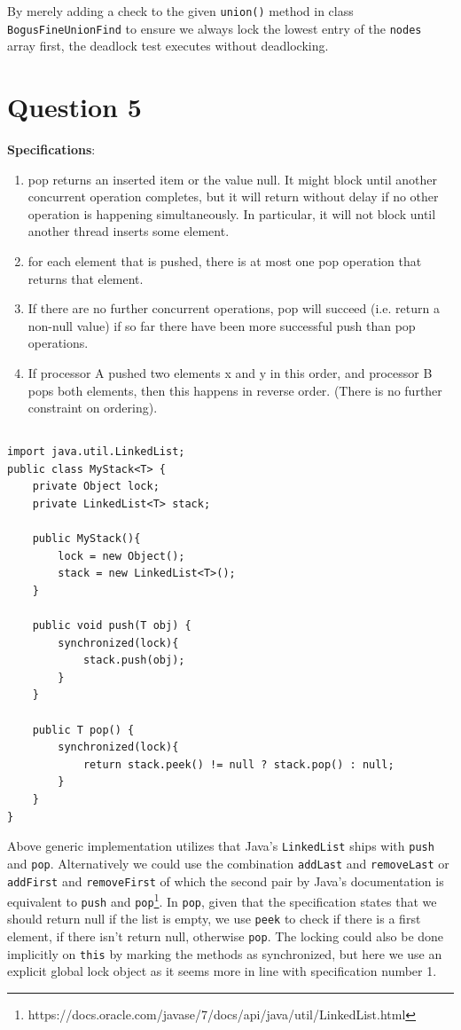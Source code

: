 \documentclass[a5paper]{article}
\begin{document}
By merely adding a check to the given \texttt{union()} method in class \texttt{BogusFineUnionFind} to ensure we always lock the lowest entry of the \texttt{nodes} array first, the deadlock test
executes without deadlocking.

\section{Question 5}
\textbf{Specifications}:
\begin{enumerate}
\item pop returns an inserted item or the value null. It might block until another concurrent operation completes, but it will return without delay if no other operation is happening simultaneously. In particular, it will not block until another thread inserts some element.
\item for each element that is pushed, there is at most one pop operation that returns that element.
\item If there are no further concurrent operations, pop will succeed (i.e. return a non-null value) if so far there
have been more successful push than pop operations.
\item If processor A pushed two elements x and y in this order, and processor B pops both elements, then this
happens in reverse order. (There is no further constraint on ordering).
\end{enumerate}

\subsection{}\label{sec:mystacksimple}
\begin{lstlisting}
import java.util.LinkedList;
public class MyStack<T> {
    private Object lock;
    private LinkedList<T> stack;

    public MyStack(){
        lock = new Object();
        stack = new LinkedList<T>();
    }

    public void push(T obj) {
        synchronized(lock){
            stack.push(obj);
        }
    }

    public T pop() {
        synchronized(lock){
            return stack.peek() != null ? stack.pop() : null;
        }
    }
}
\end{lstlisting}

Above generic implementation utilizes that Java's \texttt{LinkedList} ships with \texttt{push} and \texttt{pop}.
Alternatively we could use the combination \texttt{addLast} and \texttt{removeLast} or \texttt{addFirst} and \texttt{removeFirst} of which the second pair by Java's documentation is equivalent to \texttt{push} and \texttt{pop}\footnote{https://docs.oracle.com/javase/7/docs/api/java/util/LinkedList.html}. 
In \texttt{pop}, given that the specification states that we should return null if the list is empty, we use \texttt{peek} to check if there is a first element, if there isn't return null, otherwise \texttt{pop}.
The locking could also be done implicitly on \texttt{this} by marking the methods as synchronized, but here we use an explicit global lock object as it seems more in line with specification number 1.
\end{document}
